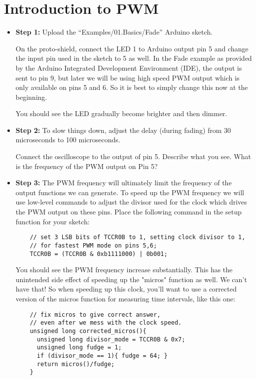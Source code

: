 \documentclass[12pt]{article}
\begin{document}
\section{Introduction to PWM}
\begin{itemize}
\item {\bf Step 1:} Upload the ``Examples/01.Basics/Fade'' Arduino sketch.

On the proto-shield, connect the LED 1 to Arduino output pin 5 and change the input pin used in the sketch to 5 as well.  In the Fade example as provided by the Arduino Integrated Development Environment (IDE), 
the output is sent to pin 9, but later we will be using high speed PWM output which is
only available on pins 5 and 6.  So it is best to simply change this now at the beginning.

You should see the LED gradually become brighter and then dimmer.

\item {\bf Step 2:} To slow things down, adjust the delay (during fading) from 30
microseconds to 100 microseconds.  

Connect the oscilloscope to the output of pin 5.  Describe what you see.  What is the frequency of the PWM output on Pin 5?

\item {\bf Step 3:} The PWM frequency will ultimately limit the frequency of the output functions we can generate.  To speed up the PWM frequency we will use low-level commands to adjust the divisor used for the clock which drives the PWM output on these pins.  Place the following command in the setup function for your sketch:
\begin{verbatim}
    // set 3 LSB bits of TCCR0B to 1, setting clock divisor to 1,
    // for fastest PWM mode on pins 5,6;
    TCCR0B = (TCCR0B & 0xb1111000) | 0b001;
\end{verbatim}
You should see the PWM frequency increase substantially.  This has the unintended side effect of speeding up the "micros" function as well.  We can't have that!  So when speeding up this clock, you'll want to use a corrected version of the micros function for measuring time intervals, like this one:

\begin{verbatim}
    // fix micros to give correct answer,
    // even after we mess with the clock speed.
    unsigned long corrected_micros(){
      unsigned long divisor_mode = TCCR0B & 0x7;
      unsigned long fudge = 1;
      if (divisor_mode == 1){ fudge = 64; }  
      return micros()/fudge;
    }
\end{verbatim}

\end{itemize}
\end{document}
